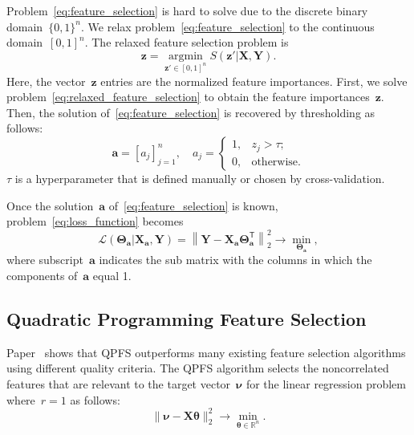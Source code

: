 \documentclass[preprint,12pt]{elsarticle}
\theoremstyle{definition}
\newcommand{\ba}{\mathbf{a}}
\newcommand{\bz}{\mathbf{z}}
\newcommand{\bY}{\mathbf{Y}}
\newcommand{\bX}{\mathbf{X}}
\newcommand{\bbR}{\mathbb{R}}
\newcommand{\T}{\mathsf{T}}
\newcommand{\bnu}{\boldsymbol{\nu}}
\newcommand{\btheta}{\boldsymbol{\theta}}
\newcommand{\bTheta}{\boldsymbol{\Theta}}
\newcommand{\argmin}{\mathop{\arg \min}\limits}
\begin{document}
Problem~\eqref{eq:feature_selection} is hard to solve due to the discrete binary domain~$\{0, 1\}^n$. We relax problem~\eqref{eq:feature_selection} to the continuous domain~$[0, 1]^n$. The relaxed feature selection problem is
\begin{equation}
\bz = \argmin_{\bz' \in [0, 1]^n} S(\bz' | \bX, \bY).
\label{eq:relaxed_feature_selection}
\end{equation}
Here, the vector~$\bz$ entries are the normalized feature importances.
First, we solve problem~\eqref{eq:relaxed_feature_selection} to obtain the feature importances~$\bz$. 
Then, the solution of~\eqref{eq:feature_selection} is recovered by thresholding as follows:
\begin{equation*}
\ba = [a_j]_{j=1}^n, \quad 
a_j = \begin{cases}
1, & z_j > \tau; \\
0, & \text{otherwise}.
\end{cases}
\end{equation*}
$\tau$ is a hyperparameter that is defined manually or chosen by cross-validation. 

Once the solution~$\ba$ of~\eqref{eq:feature_selection} is known, problem~\eqref{eq:loss_function} becomes
\begin{equation*}
\mathcal{L}(\bTheta_{\ba} | \bX_{\ba}, \bY) = {\left\| \mathbf{Y} - \bX_{\ba}\bTheta^{\T}_{\ba} \right\| }_2^2 \rightarrow\min_{\bTheta_{\ba}},
\end{equation*}
where subscript~$\ba$ indicates the sub matrix with the columns in which the components of~$\ba$ equal 1.

\subsection{Quadratic Programming Feature Selection}

Paper~\cite{katrutsa2017comprehensive} shows that QPFS outperforms many existing feature selection algorithms using different quality criteria.
The QPFS algorithm selects the noncorrelated features that are relevant to the target vector~$\bnu$ for the linear regression problem where~$r=1$ as follows:
\begin{equation*}
\| \bnu - \bX \btheta\|_2^2 \rightarrow\min_{\btheta \in \bbR^{n}}.
\end{equation*}
\end{document}
